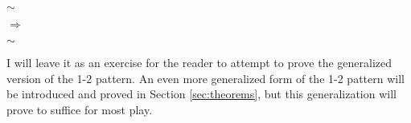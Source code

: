 \begin{center}
    \begin{minipage}{0.2\linewidth}\centering\resizebox{1\linewidth}{!}{\begin{minesweeperboard}
        \cellsafe \& \cellunk \& \cellunk \& \cellunk\\
        \celldc \& \cellone \& \celltwo \& \celldc\\
        \cellzero \& \cellzero \& \cellzero \& \cellzero\\
    \end{minesweeperboard}}\end{minipage}{\huge$\sim$}
    \begin{minipage}{0.2\linewidth}\centering{}\end{minipage}{\huge$\Rightarrow$}
    \begin{minipage}{0.2\linewidth}\centering\resizebox{1\linewidth}{!}{\begin{minesweeperboard}
        \celldc \& \celldc \& \celldc \& \cellmine\\
        \celldc \& \cellzeromarked \& \cellone \& \celldc\\
        \cellzero \& \cellzero \& \cellzero \& \cellzero\\
    \end{minesweeperboard}}\end{minipage}{\huge$\sim$}
    \begin{minipage}{0.2\linewidth}\centering\resizebox{1\linewidth}{!}{\begin{minesweeperboard}
        \cellsafe \& \cellunk \& \cellunk \& \cellmine\\
        \celldc \& \cellone \& \celltwo \& \celldc\\
        \cellzero \& \cellzero \& \cellzero \& \cellzero\\
    \end{minesweeperboard}}\end{minipage}
\end{center}

I will leave it as an exercise for the reader to attempt to prove the generalized version of the 1-2 pattern. An even more generalized form of the 1-2 pattern will be introduced and proved in Section \ref{sec:theorems}, but this generalization will prove to suffice for most play.

